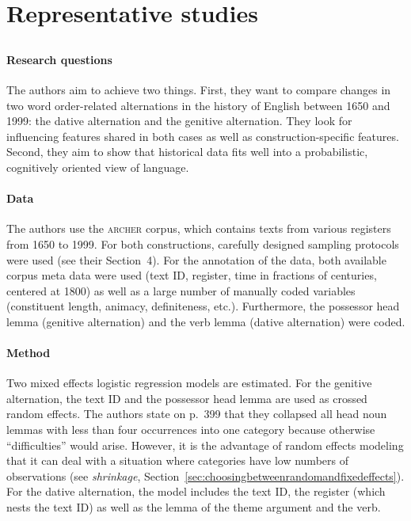 \documentclass[a4paper,12pt]{article}
\begin{document}
\section{Representative studies}

\begin{mdframed}
  \subsection*{\citet{WolkEa2013}}
  
  \paragraph{Research questions}

  The authors aim to achieve two things.
  First, they want to compare changes in two word order-related alternations in the history of English between 1650 and 1999: the dative alternation and the genitive alternation.
  They look for influencing features shared in both cases as well as construction-specific features.
  Second, they aim to show that historical data fits well into a probabilistic, cognitively oriented view of language.

  \paragraph{Data}

  The authors use the \textsc{archer} corpus, which contains texts from various registers from 1650 to 1999.
  For both constructions, carefully designed sampling protocols were used (see their Section~4).
  For the annotation of the data, both available corpus meta data were used (text ID, register, time in fractions of centuries, centered at 1800) as well as a large number of manually coded variables (constituent length, animacy, definiteness, etc.).
  Furthermore, the possessor head lemma (genitive alternation) and the verb lemma (dative alternation) were coded.

  \paragraph{Method}

  Two mixed effects logistic regression models are estimated.
  For the genitive alternation, the text ID and the possessor head lemma are used as crossed random effects.
  The authors state on p.~399 that they collapsed all head noun lemmas with less than four occurrences into one category because otherwise ``difficulties'' would arise.
  However, it is the advantage of random effects modeling that it can deal with a situation where categories have low numbers of observations (see \textit{shrinkage}, Section~\ref{sec:choosingbetweenrandomandfixedeffects}).
  For the dative alternation, the model includes the text ID, the register (which nests the text ID) as well as the lemma of the theme argument and the verb. 


\end{mdframed}
\end{document}
